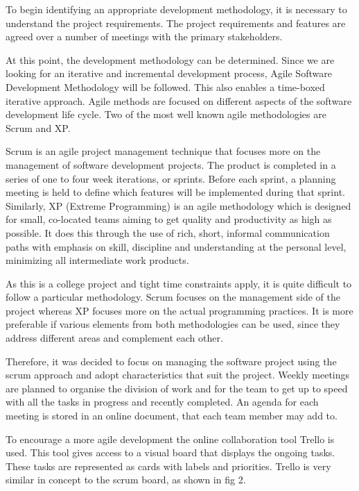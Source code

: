 To begin identifying an appropriate development methodology, it is necessary to
understand the project requirements. The project requirements and features are
agreed over a number of meetings with the primary stakeholders. 

At this point, the development methodology can be determined. Since we are
looking for an iterative and incremental development process, Agile Software
Development Methodology will be followed. This also enables a time-boxed iterative approach. Agile methods are focused on different aspects of the software development life cycle. Two of the most well known agile methodologies are Scrum and XP.

Scrum is an agile project management technique that focuses more on the
management of software development projects. The product is completed in a
series of one to four week iterations, or sprints. Before each sprint, a
planning meeting is held to define which features will be implemented during
that sprint. Similarly, XP (Extreme Programming) is an agile methodology which
is designed for small, co-located teams aiming to get quality and productivity
as high as possible. It does this through the use of rich, short, informal
communication paths with emphasis on skill, discipline and understanding at the personal level, minimizing all intermediate work products.

As this is a college project and tight time constraints apply, it is quite
difficult to follow a particular methodology. Scrum focuses on the management
side of the project whereas XP focuses more on the actual programming
practices. It is more preferable if various elements from both methodologies
can be used, since they address different areas and complement each other.

Therefore, it was decided to focus on managing the software project using the scrum
approach and adopt characteristics that suit the project. Weekly meetings are planned to organise the division
of work and for the team to get up to speed with all the tasks in progress and recently
completed. An agenda for each meeting is stored in an online document, that
each team member may add to. 

To encourage a more agile development the online collaboration tool
Trello is used. This tool gives access to a visual board that displays the
ongoing tasks. These tasks are represented as cards with labels and priorities. 
Trello is very similar in concept to the scrum board, as shown in fig 2.

